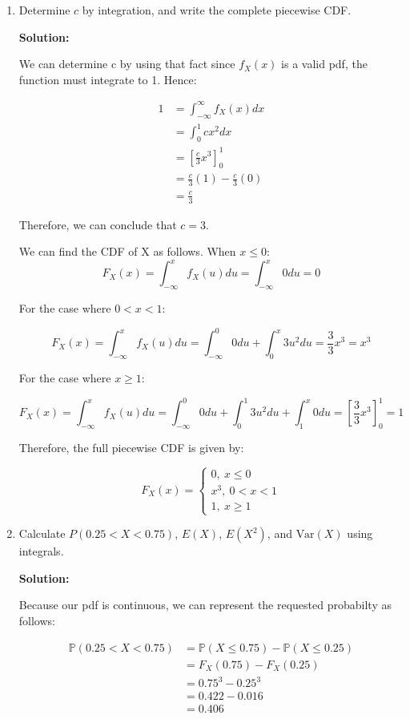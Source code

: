\documentclass[11pt]{article}
\newcommand{\solution}{\par\medskip\noindent\textbf{Solution:}\par\vspace{0cm}}
\begin{document}
\begin{enumerate}[label=\textbf{(\alph*)}]
  \item Determine $c$ by integration, and write the complete piecewise CDF.
  \solution

  We can determine c by using that fact since $f_X(x)$ is a valid pdf, the function must integrate to 1. Hence:

  \begin{align*}
    1 &= \int_{-\infty}^{\infty} f_X(x) dx \\
    &= \int_{0}^{1} cx^2 dx\\
    &= [\frac{c}{3}x^3]_{0}^{1} \\
    &= \frac{c}{3}(1) - \frac{c}{3}(0) \\
    &= \frac{c}{3}
  \end{align*}

  Therefore, we can conclude that $c = 3$.

  We can find the CDF of X as follows. When $x \leq 0$:
  \[
  F_X(x) = \int_{-\infty}^{x} f_X(u) du = \int_{-\infty}^{x} 0 du = 0
  \]

  
  
  For the case where $0 < x < 1$:

  \[
  F_X(x) = \int_{-\infty}^{x} f_X(u) du = \int_{-\infty}^{0} 0 du + \int_{0}^{x} 3u^2 du = \frac{3}{3}x^3 = x^3
  \]

  For the case where $x \geq 1$:

  \[
  F_X(x) = \int_{-\infty}^{x} f_X(u) du = \int_{-\infty}^{0} 0 du + \int_{0}^{1} 3u^2 du  + \int_{1}^{x} 0 du= [\frac{3}{3}x^3]^1_0 = 1
  \]

  Therefore, the full piecewise CDF is given by:

  \[
  F_X(x) = \begin{cases}
    0, \ x \leq 0 \\
    x^3, \ 0 < x < 1 \\
    1, \ x \geq 1
  \end{cases}
  \]



  \item Calculate $P(0.25 < X < 0.75)$, $E(X)$, $E(X^2)$, and $\text{Var}(X)$ using integrals.
  \solution

  Because our pdf is continuous, we can represent the requested probabilty as follows:

  \begin{align*}
    \mathbb{P}(0.25 < X < 0.75) &= \mathbb{P}(X \leq 0.75) - \mathbb{P}(X \leq 0.25) \\
    &= F_X(0.75) - F_X(0.25) \\
    &= 0.75^3 - 0.25^3 \\
    &= 0.422 - 0.016 \\
    &= 0.406
  \end{align*}


\end{enumerate}
\end{document}
